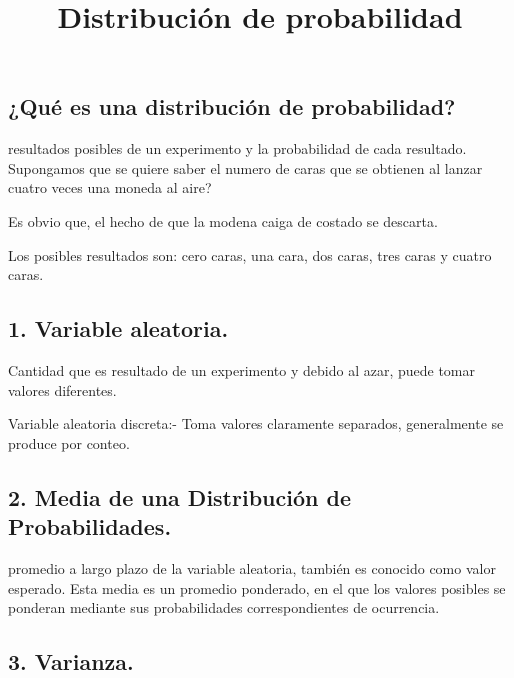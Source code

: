 \documentclass[
]{article}
\title{Distribución de probabilidad}
\author{}
\date{\vspace{-2.5em}}
\begin{document}
\maketitle

\hypertarget{quuxe9-es-una-distribuciuxf3n-de-probabilidad}{%
\subsection{¿Qué es una distribución de
probabilidad?}\label{quuxe9-es-una-distribuciuxf3n-de-probabilidad}}

\pagebreak

resultados posibles de un experimento y la probabilidad de cada
resultado. \pagebreak Supongamos que se quiere saber el numero de caras
que se obtienen al lanzar cuatro veces una moneda al aire?

Es obvio que, el hecho de que la modena caiga de costado se descarta.

Los posibles resultados son: cero caras, una cara, dos caras, tres caras
y cuatro caras.

\hypertarget{variable-aleatoria.}{%
\subsection{1. Variable aleatoria.}\label{variable-aleatoria.}}

\pagebreak

Cantidad que es resultado de un experimento y debido al azar, puede
tomar valores diferentes.

Variable aleatoria discreta:- Toma valores claramente separados,
generalmente se produce por conteo.

\hypertarget{media-de-una-distribuciuxf3n-de-probabilidades.}{%
\subsection{2. Media de una Distribución de
Probabilidades.}\label{media-de-una-distribuciuxf3n-de-probabilidades.}}

\pagebreak

promedio a largo plazo de la variable aleatoria, también es conocido
como valor esperado. Esta media es un promedio ponderado, en el que los
valores posibles se ponderan mediante sus probabilidades
correspondientes de ocurrencia.

\hypertarget{varianza.}{%
\subsection{3. Varianza.}\label{varianza.}}
\end{document}
